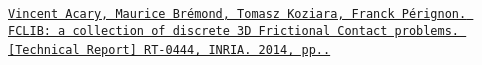 \href{https://hal.inria.fr/hal-00945820v2/document}{\tt Vincent Acary, Maurice Br\'{e}mond, Tomasz Koziara, Franck P\'{e}rignon. F\+C\+L\+I\+B\+: a collection of discrete 3\+D Frictional Contact problems. \mbox{[}Technical Report\mbox{]} R\+T-\/0444, I\+N\+R\+I\+A. 2014, pp..} ~\newline


~\newline
 

~\newline
 